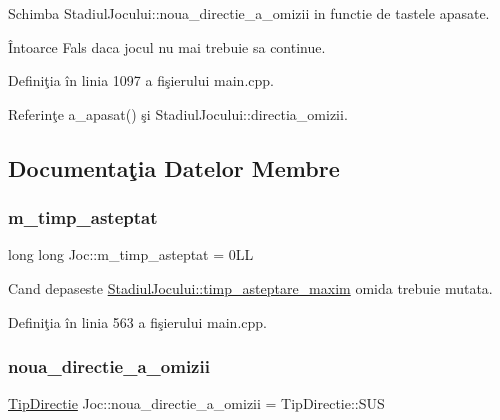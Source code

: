 Schimba Stadiul\+Jocului\+::noua\+\_\+directie\+\_\+a\+\_\+omizii in functie de tastele apasate. 

\begin{DoxyReturn}{Întoarce}
Fals daca jocul nu mai trebuie sa continue. 
\end{DoxyReturn}


Definiţia în linia 1097 a fişierului main.\+cpp.



Referinţe a\+\_\+apasat() şi Stadiul\+Jocului\+::directia\+\_\+omizii.



\subsection{Documentaţia Datelor Membre}
\mbox{\label{classJoc_a24e667d511404dd6479a86575f0969c2}} 
\subsubsection{\texorpdfstring{m\+\_\+timp\+\_\+asteptat}{m\_timp\_asteptat}}
{\footnotesize\ttfamily long long Joc\+::m\+\_\+timp\+\_\+asteptat = 0\+LL\hspace{0.3cm}{\ttfamily [private]}}

Cand depaseste \hyperlink{classStadiulJocului_a4cdf9582b472e74980e1eee73ca94769}{Stadiul\+Jocului\+::timp\+\_\+asteptare\+\_\+maxim} omida trebuie mutata. 

Definiţia în linia 563 a fişierului main.\+cpp.

\mbox{\label{classJoc_af8df04a66ec45e3373dc6961b8f4a7cc}} 
\subsubsection{\texorpdfstring{noua\+\_\+directie\+\_\+a\+\_\+omizii}{noua\_directie\_a\_omizii}}
{\footnotesize\ttfamily \hyperlink{main_8cpp_aea66a0d525bf9bfb9b61e9cc1ba0b752}{Tip\+Directie} Joc\+::noua\+\_\+directie\+\_\+a\+\_\+omizii = Tip\+Directie\+::\+S\+US\hspace{0.3cm}{\ttfamily [private]}}

